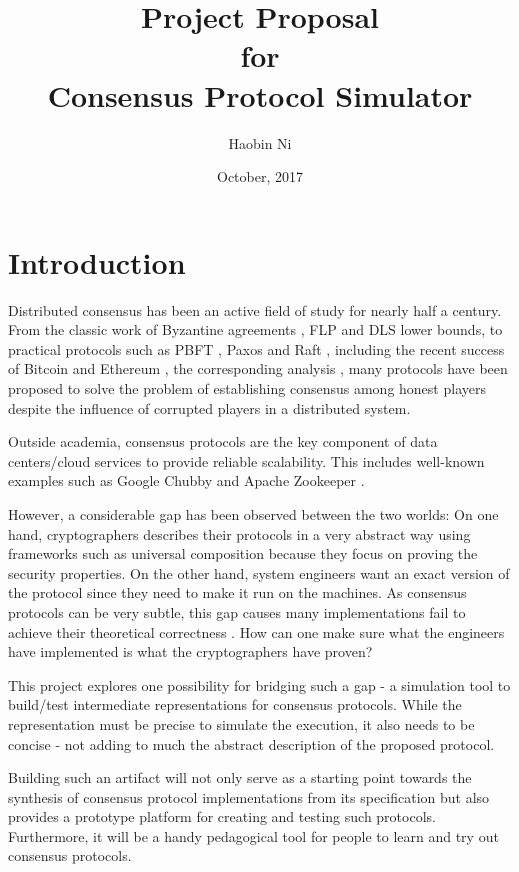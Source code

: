 \documentclass{article}
\title{Project Proposal \\ for \\ Consensus Protocol Simulator}
\date{October, 2017}
\author{Haobin Ni}
\begin{document}
	\maketitle

	\section{Introduction}
	Distributed consensus has been an active field of study for nearly half a century.	From the classic work of Byzantine agreements \cite{Lamport82} \cite{DolevStrong83}, FLP \cite{FLP85} and DLS \cite{DLS88} lower bounds, to practical protocols such as PBFT \cite{PBFT99}, Paxos \cite{Paxos06} and Raft \cite{Raft14}, including the recent success of Bitcoin \cite{Bitcoin09} and Ethereum \cite{Ethereum14}, the corresponding analysis \cite{Rafael16}, many protocols have been proposed to solve the problem of establishing consensus among honest players despite the influence of corrupted players in a distributed system.
	
    Outside academia, consensus protocols are the key component of data centers/cloud services to provide reliable scalability. This includes well-known examples such as Google Chubby \cite{Chubby06} and Apache Zookeeper \cite{Zookeeper10}.
    
    However, a considerable gap has been observed between the two worlds: On one hand, cryptographers describes their protocols in a very abstract way using frameworks such as universal composition \cite{UC01} because they focus on proving the security properties. On the other hand, system engineers want an exact version of the protocol since they need to make it run on the machines. As consensus protocols can be very subtle, this gap causes many implementations fail to achieve their theoretical correctness \cite{Bugs14} \cite{Bugs16} \cite{Bugs17}. How can one make sure what the engineers have implemented is what the cryptographers have proven?
   
    This project explores one possibility for bridging such a gap - a simulation tool to build/test intermediate representations for consensus protocols. While the representation must be precise to simulate the execution, it also needs to be concise - not adding to much the abstract description of the proposed protocol.
   
    Building such an artifact will not only serve as a starting point towards the synthesis of consensus protocol implementations from its specification but also provides a prototype platform for creating and testing such protocols. Furthermore, it will be a handy pedagogical tool for people to learn and try out consensus protocols.
\end{document}
